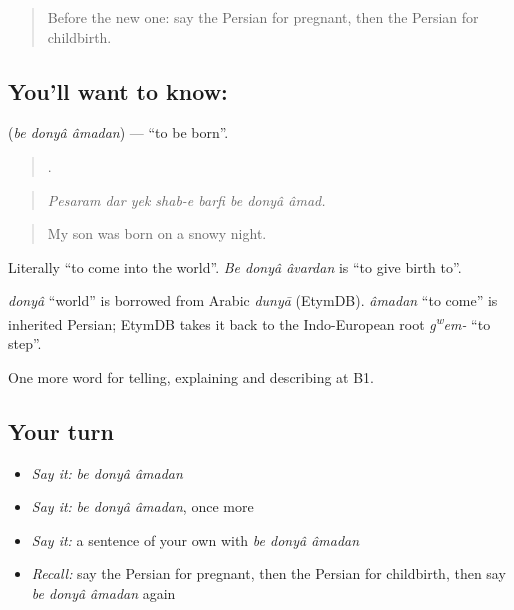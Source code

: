 \label{lesson:FA-C332-be-donya-amadan}



\begin{quote}
Before the new one: say the Persian for pregnant, then the Persian for childbirth.
\end{quote}

\subsection*{You'll want to know:   }
\textbf{  } (\emph{be donyâ âmadan}) — \textquotedblleft{}to be born\textquotedblright{}.

\begin{quote}
       .
\end{quote}

\begin{quote}
\emph{Pesaram dar yek shab-e barfi be donyâ âmad.}
\end{quote}

\begin{quote}
My son was born on a snowy night.
\end{quote}

Literally \textquotedblleft{}to come into the world\textquotedblright{}. \emph{Be donyâ âvardan} is \textquotedblleft{}to give birth to\textquotedblright{}.

\begin{cousinweb}
\emph{donyâ} \textquotedblleft{}world\textquotedblright{} is borrowed from Arabic \emph{dunyā} (EtymDB). \emph{âmadan} \textquotedblleft{}to come\textquotedblright{} is inherited Persian; EtymDB takes it back to the Indo-European root \emph{g\textsuperscript{w}em-} \textquotedblleft{}to step\textquotedblright{}.
\end{cousinweb}

\begin{grammarlens}[title={What you've built}]
One more word for telling, explaining and describing at B1.
\end{grammarlens}

\subsection*{Your turn}
\begin{itemize}
\raggedright
  \item \emph{Say it:} \emph{be donyâ âmadan}
  \item \emph{Say it:} \emph{be donyâ âmadan}, once more
  \item \emph{Say it:} a sentence of your own with \emph{be donyâ âmadan}
  \item \emph{Recall:} say the Persian for pregnant, then the Persian for childbirth, then say \emph{be donyâ âmadan} again
\end{itemize}

